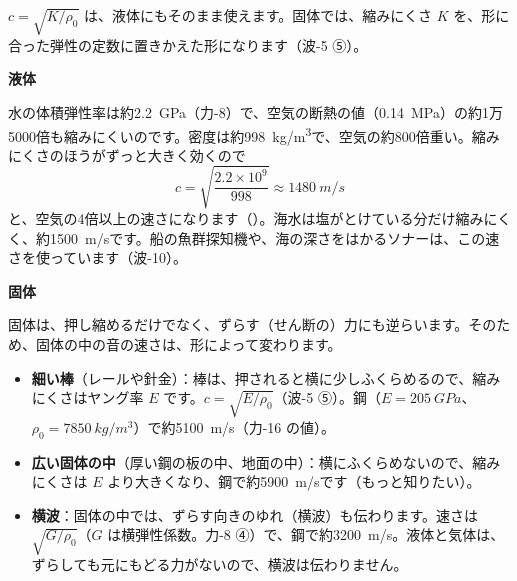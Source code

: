 \begin{phflow}
\end{phflow}


\leavevmode\label{ph:波-9:sec4}$c=\sqrt{K/\rho_0}$ は、液体にもそのまま使えます。固体では、縮みにくさ $K$ を、形に合った弾性の定数に置きかえた形になります（波-5 ⑤）。

\noindent\textbf{液体}\par\nobreak
水の体積弾性率は約\qty{2.2}{GPa}（力-8）で、空気の断熱の値（\qty{0.14}{MPa}）の約1万5000倍も縮みにくいのです。密度は約\qty{998}{kg/m^3}で、空気の約800倍重い。縮みにくさのほうがずっと大きく効くので
\[ c=\sqrt{\frac{2.2\times10^9}{998}}\approx\qty{1480}{m/s} \]
と、空気の4倍以上の速さになります（）。海水は塩がとけている分だけ縮みにくく、約\qty{1500}{m/s}です。船の魚群探知機や、海の深さをはかるソナーは、この速さを使っています（波-10）。

\noindent\textbf{固体}\par\nobreak
固体は、押し縮めるだけでなく、ずらす（せん断の）力にも逆らいます。そのため、固体の中の音の速さは、形によって変わります。
\begin{itemize}[leftmargin=1.2\zw, itemsep=2pt, topsep=2pt, label={\color{bkTheme}●}]
\item \textbf{細い棒}（レールや針金）：棒は、押されると横に少しふくらめるので、縮みにくさはヤング率 $E$ です。$c=\sqrt{E/\rho_0}$（波-5 ⑤）。鋼（$E=\qty{205}{GPa}$、$\rho_0=\qty{7850}{kg/m^3}$）で約\qty{5100}{m/s}（力-16 の値）。
\item \textbf{広い固体の中}（厚い鋼の板の中、地面の中）：横にふくらめないので、縮みにくさは $E$ より大きくなり、鋼で約\qty{5900}{m/s}です（もっと知りたい）。
\item \textbf{横波}：固体の中では、ずらす向きのゆれ（横波）も伝わります。速さは $\sqrt{G/\rho_0}$（$G$ は横弾性係数。力-8 ④）で、鋼で約\qty{3200}{m/s}。液体と気体は、ずらしても元にもどる力がないので、横波は伝わりません。
\end{itemize}


